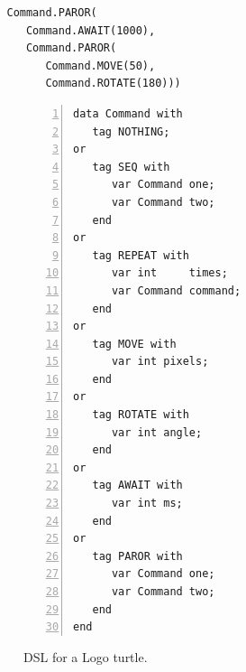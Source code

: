\documentclass{acm_proc_article-sp}
\begin{document}
\begin{verbatim}
   Command.PAROR(
      Command.AWAIT(1000),
      Command.PAROR(
         Command.MOVE(50),
         Command.ROTATE(180)))
\end{verbatim}

\begin{figure}%
\begin{lstlisting}[numbers=left,xleftmargin=3em]
data Command with
   tag NOTHING;
or
   tag SEQ with
      var Command one;
      var Command two;
   end
or
   tag REPEAT with
      var int     times;
      var Command command;
   end
or
   tag MOVE with
      var int pixels;
   end
or
   tag ROTATE with
      var int angle;
   end
or
   tag AWAIT with
      var int ms;
   end
or
   tag PAROR with
      var Command one;
      var Command two;
   end
end
\end{lstlisting}
\caption{ DSL for a Logo turtle.
\label{lst.turtle.dsl}
}
\end{figure}

\end{document}
